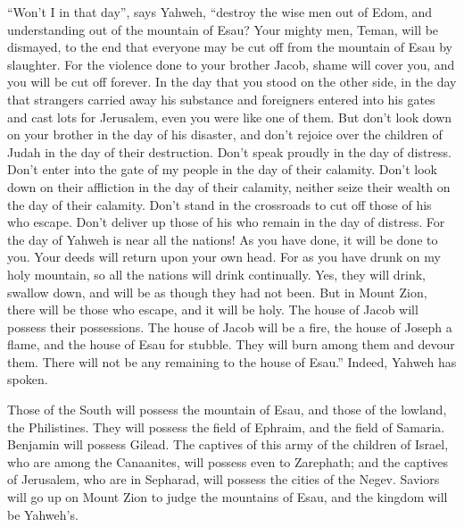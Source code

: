  ``Won't I in that day'', says Yahweh, ``destroy the wise
men out of Edom, and understanding out of the mountain of Esau?
 Your mighty men, Teman, will be dismayed, to the end that
everyone may be cut off from the mountain of Esau by slaughter.
 For the violence done to your brother Jacob, shame will
cover you, and you will be cut off forever.  In the day
that you stood on the other side, in the day that strangers carried away
his substance and foreigners entered into his gates and cast lots for
Jerusalem, even you were like one of them.  But don't
look down on your brother in the day of his disaster, and don't rejoice
over the children of Judah in the day of their destruction. Don't speak
proudly in the day of distress.  Don't enter into the
gate of my people in the day of their calamity. Don't look down on their
affliction in the day of their calamity, neither seize their wealth on
the day of their calamity.  Don't stand in the crossroads
to cut off those of his who escape. Don't deliver up those of his who
remain in the day of distress.  For the day of Yahweh is
near all the nations! As you have done, it will be done to you. Your
deeds will return upon your own head.  For as you have
drunk on my holy mountain, so all the nations will drink continually.
Yes, they will drink, swallow down, and will be as though they had not
been.  But in Mount Zion, there will be those who escape,
and it will be holy. The house of Jacob will possess their possessions.
 The house of Jacob will be a fire, the house of Joseph a
flame, and the house of Esau for stubble. They will burn among them and
devour them. There will not be any remaining to the house of Esau.''
Indeed, Yahweh has spoken.

 Those of the South will possess the mountain of Esau,
and those of the lowland, the Philistines. They will possess the field
of Ephraim, and the field of Samaria. Benjamin will possess Gilead.
 The captives of this army of the children of Israel, who
are among the Canaanites, will possess even to Zarephath; and the
captives of Jerusalem, who are in Sepharad, will possess the cities of
the Negev.  Saviors will go up on Mount Zion to judge the
mountains of Esau, and the kingdom will be Yahweh's.
